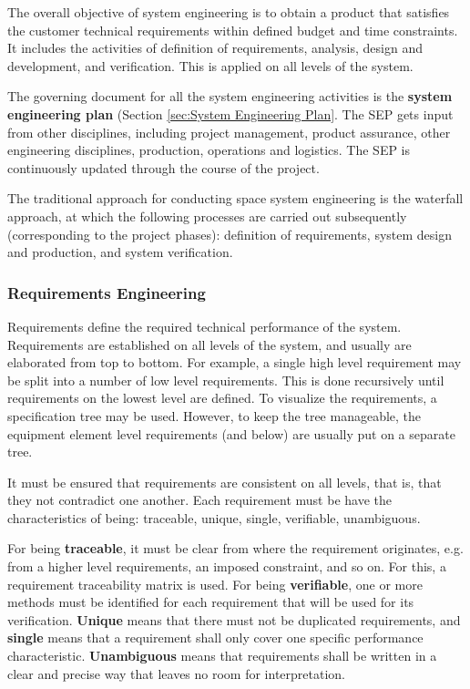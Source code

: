 The overall objective of system engineering is to obtain a product that satisfies the customer technical requirements within defined budget and time constraints. It includes the activities of definition of requirements, analysis, design and development, and verification. This is applied on all levels of the system. 

The governing document for all the system engineering activities is the \textbf{system engineering plan} (Section \ref{sec:System Engineering Plan}. The SEP gets input from other disciplines, including project management, product assurance, other engineering disciplines, production, operations and logistics. The SEP is continuously updated through the course of the project.

The traditional approach for conducting space system engineering is the waterfall approach, at which the following processes are carried out subsequently (corresponding to the project phases): definition of requirements, system design and production, and system verification.

\subsubsection{Requirements Engineering}

Requirements define the required technical performance of the system. Requirements are established on all levels of the system, and usually are elaborated from top to bottom. For example, a single high level requirement may be split into a number of low level requirements. This is done recursively until requirements on the lowest level are defined. To visualize the requirements, a specification tree may be used. However, to keep the tree manageable, the equipment element level requirements (and below) are usually put on a separate tree.

It must be ensured that requirements are consistent on all levels, that is, that they not contradict one another. Each requirement must be have the characteristics of being: traceable, unique, single, verifiable, unambiguous.

For being \textbf{traceable}, it must be clear from where the requirement originates, e.g. from a higher level requirements, an imposed constraint, and so on. For this, a requirement traceability matrix is used. For being \textbf{verifiable}, one or more methods must be identified for each requirement that will be used for its verification. \textbf{Unique} means that there must not be duplicated requirements, and \textbf{single} means that a requirement shall only cover one specific performance characteristic. \textbf{Unambiguous} means that requirements shall be written in a clear and precise way that leaves no room for interpretation.


